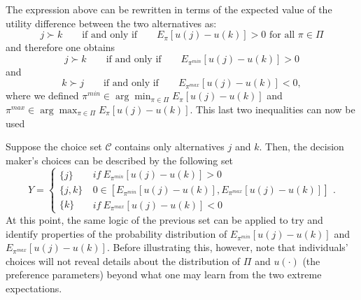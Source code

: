 \documentclass[reqno]{article}
\begin{document}
The expression above can be rewritten in terms of the expected value of the
utility difference between the two alternatives as:%
\begin{equation*}
j\succ k\qquad \text{if and only if}\qquad E_{\pi }\left[ u\left( j\right)
-u\left( k\right) \right] >0\text{ for all }\pi \in \Pi
\end{equation*}%
and therefore one obtains%
\begin{equation*}
j\succ k\qquad \text{if and only if}\qquad E_{\pi ^{min}}\left[ u\left(
j\right) -u\left( k\right) \right] >0
\end{equation*}%
and 
\begin{equation*}
k\succ j\qquad \text{if and only if}\qquad E_{\pi ^{max}}\left[ u\left(
j\right) -u\left( k\right) \right] <0,
\end{equation*}%
where we defined $\pi ^{min}\in \arg \min_{\pi \in \Pi }E_{\pi }\left[
u\left( j\right) -u\left( k\right) \right] $ and $\pi ^{max}\in \arg
\max_{\pi \in \Pi }E_{\pi }\left[ u\left( j\right) -u\left( k\right) \right] 
$. This last two inequalities can now be used

Suppose the choice set $\mathcal{C}$ contains only alternatives $j$ and $k$.
Then, the decision maker's choices can be described by the following set%
\begin{equation*}
Y=\left\{ 
\begin{array}{c}
\{j\} \\ 
\{j,k\} \\ 
\{k\}%
\end{array}%
\ 
\begin{array}{c}
if\ E_{\pi ^{min}}\left[ u\left( j\right) -u\left( k\right) \right] >0 \\ 
0\in \left[ E_{\pi ^{min}}\left[ u\left( j\right) -u\left( k\right) \right]
,E_{\pi ^{max}}\left[ u\left( j\right) -u\left( k\right) \right] \right] \\ 
if\ E_{\pi ^{max}}\left[ u\left( j\right) -u\left( k\right) \right] <0%
\end{array}%
\right. .
\end{equation*}%
At this point, the same logic of the previous set can be applied to try and
identify properties of the probability distribution of $E_{\pi ^{min}}\left[
u\left( j\right) -u\left( k\right) \right] $ and $E_{\pi ^{max}}\left[
u\left( j\right) -u\left( k\right) \right] $. Before illustrating this,
however, note that individuals' choices will not reveal details about the
distribution of $\Pi $ and $u\left( \cdot \right) $ (the preference
parameters) beyond what one may learn from the two extreme expectations.
\end{document}
